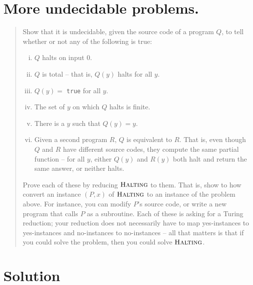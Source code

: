 

\maketitle
\thispagestyle{firststyle}
\vspace{-2.0cm}
\section{More undecidable problems. }
\begin{quote}
    Show that it is undecidable, given the source code of a program $Q$, to tell whether or not any of the following is true:
    \begin{enumerate}[(i)]
      \item $Q$ halts on input 0.
      \item $Q$ is total -- that is, $Q(y)$ halts for all $y$.
      \item $Q(y)=$ {\tt true} for all $y$.
      \item The set of $y$ on which $Q$ halts is finite.
      \item There is a $y$ such that $Q(y)= y$.
      \item Given a second program $R$, $Q$ is equivalent to $R$.
      That is, even though $Q$ and $R$ have different source codes,
      they compute the same partial function --
      for all $y$, either $Q(y)$ and $R(y)$ both halt and return the same answer, or neither halts.
    \end{enumerate}
    Prove each of these by reducing $\textsc{Halting}$ to them.
    That is, show to how convert an instance $(P, x)$ of $\textsc{Halting}$ to an instance of the problem above.
    For instance, you can modify $P$'s source code,
    or write a new program that calls $P$ as a subroutine.
    Each of these is asking for a Turing reduction;
    your reduction does not necessarily have to map yes-instances to yes-instances and no-instances to no-instances --
    all that matters is that if you could solve the problem,
    then you could solve $\textsc{Halting}$.
\end{quote}

\section*{Solution}

